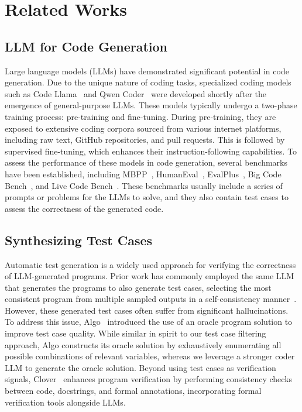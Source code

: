 \section{Related Works}
\label{sec:related_works}
\subsection{LLM for Code Generation}
\label{subsec:llm_for_coding}
Large language models (LLMs) have demonstrated significant potential in code generation. Due to the unique nature of coding tasks, specialized coding models such as Code Llama~\citep{codellama} and Qwen Coder~\citep{hui2024qwen2,qwen2} were developed shortly after the emergence of general-purpose LLMs. These models typically undergo a two-phase training process: pre-training and fine-tuning. During pre-training, they are exposed to extensive coding corpora sourced from various internet platforms, including raw text, GitHub repositories, and pull requests. This is followed by supervised fine-tuning, which enhances their instruction-following capabilities.
To assess the performance of these models in code generation, several benchmarks have been established, including MBPP~\citep{austin2021program}, HumanEval~\citep{codex}, EvalPlus~\citep{evalplus, evalperf}, Big Code Bench~\citep{zhuo2024bigcodebench}, and Live Code Bench~\citep{jain2024livecodebench}. These benchmarks usually include a series of prompts or problems for the LLMs to solve, and they also contain test cases to assess the correctness of the generated code.


\subsection{Synthesizing Test Cases}
Automatic test generation is a widely used approach for verifying the correctness of LLM-generated programs. Prior work has commonly employed the same LLM that generates the programs to also generate test cases, selecting the most consistent program from multiple sampled outputs in a self-consistency manner~\citep{Chen2022CodeTCG,Huang2023EnhancingLL,Jiao2024PreferenceOF}. However, these generated test cases often suffer from significant hallucinations. To address this issue, Algo~\citep{Zhang2023ALGOSA} introduced the use of an oracle program solution to improve test case quality. While similar in spirit to our test case filtering approach, Algo constructs its oracle solution by exhaustively enumerating all possible combinations of relevant variables, whereas we leverage a stronger coder LLM to generate the oracle solution. Beyond using test cases as verification signals, Clover~\citep{Sun2023CloverCV} enhances program verification by performing consistency checks between code, docstrings, and formal annotations, incorporating formal verification tools alongside LLMs.

